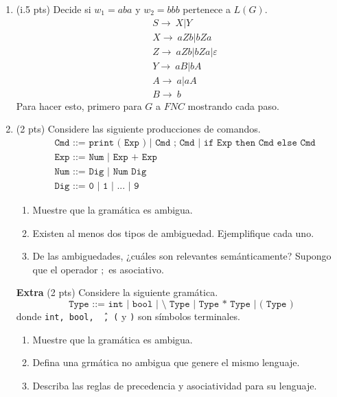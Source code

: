 \documentclass{article}
\begin{document}
\begin{enumerate}
        \item (i.5 pts) Decide si $w_1 = aba$ y $w_2 = bbb$ pertenece a $L(G)$.
        \begin{align*}
            &S \rightarrow \ X | Y \\
            &X \rightarrow \ aZb | bZa \\
            &Z \rightarrow \ aZb | bZa | \varepsilon \\
            &Y \rightarrow \ aB | bA \\
            &A \rightarrow \ a | aA \\
            &B \rightarrow \ b
        \end{align*}
        Para hacer esto, primero para $G$ a $FNC$ mostrando cada paso.

        \item (2 pts) Considere las siguiente producciones de comandos.
        \begin{align*}
            &\texttt{Cmd ::= print ( Exp ) | Cmd ; Cmd | if Exp then Cmd else Cmd} \\
            &\texttt{Exp ::= Num | Exp + Exp} \\
            &\texttt{Num ::= Dig | Num Dig} \\
            &\texttt{Dig ::= 0 | 1 | ... | 9}
        \end{align*}

        \begin{enumerate}
            \item Muestre que la gramática es ambigua.
            \item Existen al menos dos tipos de ambiguedad. Ejemplifique cada uno.
            \item De las ambiguedades, ¿cuáles son relevantes semánticamente? 
            Supongo que el operador $;$ es asociativo.
        \end{enumerate}
        
        \item[\textbf{Extra}] (2 pts) Considere la siguiente gramática.
        \[\texttt{Type ::= int | bool | \^\ Type | Type * Type | ( Type )}\]
        donde \texttt{int, bool, \^\ , (} y \texttt{)} son símbolos terminales.

        \begin{enumerate}
            \item Muestre que la gramática es ambigua.
            \item Defina una grmática no ambigua que genere el mismo lenguaje.
            \item Describa las reglas de precedencia y asociatividad para su
            lenguaje.
        \end{enumerate}
    \end{enumerate}
\end{document}
